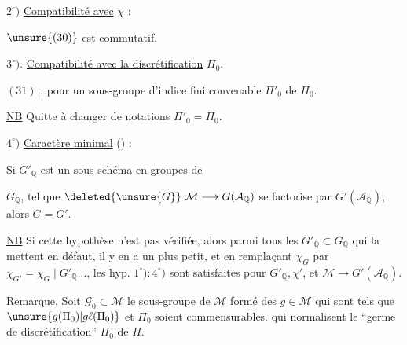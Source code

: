 \(2^\circ)\) \uline{Compatibilité avec} \(\chi\) :

\(\unsure{(30)}\)
est commutatif.

\(3^\circ)\). \uline{Compatibilité avec la discrétification} \(\Pi_0\).

\((31)\)
,
pour un sous-groupe d'indice fini convenable \(\Pi'_0\) de \(\Pi_0\).

\uline{NB} Quitte à changer de notations  \(\Pi'_0=\Pi_0\).

\(4^\circ)\) \uline{Caractère minimal} () :

Si \(G'_{\mathbb{Q}}\) est un sous-schéma en groupes de


\(G_{\mathbb{Q}}\), tel que \(\deleted{\unsure{G}}\ \mathcal{M}\longrightarrow G(\mathcal{A}_{\mathbb{Q}})\) se factorise par \(G'(\mathcal{A}_{\mathbb{Q}})\), alors \(G=G'\).

\uline{NB} Si cette hypothèse n'est pas vérifiée, alors parmi tous les \(G'_{\mathbb{Q}}\subset G_{\mathbb{Q}}\) qui la mettent en défaut, il y en a un  plus petit, et en remplaçant \(\chi_G\) par \(\chi_{G'}=\chi_G\mid G'_{\mathbb{Q}}\ldots\), les hyp. \(1^\circ):4^\circ)\) sont satisfaites pour \(G'_{\mathbb{Q}},\chi'\), et \(\mathcal{M}\longrightarrow G'(\mathcal{A}_{\mathbb{Q}})\).

\uline{Remarque}. Soit \(\mathcal{G}_0\subset\mathcal{M}\) le sous-groupe de \(\mathcal{M}\) formé des \(g\in\mathcal{M}\) qui sont tels que \(\unsure{g(\Pi_0)|g\ell(\Pi_0)}\) et \(\Pi_0\) soient commensurables.   qui normalisent le ``germe de discrétification'' \(\Pi_0\) de \(\Pi\).

